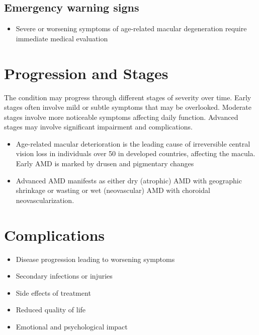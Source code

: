 \subsection{Emergency warning signs}
\begin{itemize}[noitemsep]
  \item Severe or worsening symptoms of age-related macular degeneration require immediate medical evaluation
\end{itemize}
\section{Progression and Stages}
The condition may progress through different stages of severity over time. Early stages often involve mild or subtle symptoms that may be overlooked. Moderate stages involve more noticeable symptoms affecting daily function. Advanced stages may involve significant impairment and complications.

\begin{itemize}[noitemsep]
  \item Age-related macular deterioration is the leading cause of irreversible central vision loss in individuals over 50 in developed countries, affecting the macula. Early AMD is marked by drusen and pigmentary changes
  \item Advanced AMD manifests as either dry (atrophic) AMD with geographic shrinkage or wasting or wet (neovascular) AMD with choroidal neovascularization.
\end{itemize}
\section{Complications}
\begin{itemize}[noitemsep]
  \item Disease progression leading to worsening symptoms
  \item Secondary infections or injuries
  \item Side effects of treatment
  \item Reduced quality of life
  \item Emotional and psychological impact
\end{itemize}
